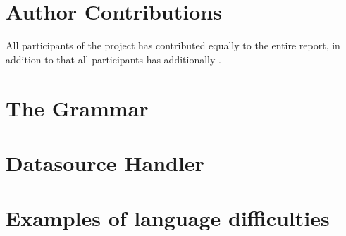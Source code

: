 \documentclass[12pt,a4paper]{article}
\begin{document}
\appendix
\section{Author Contributions}
All participants of the project has contributed equally to the entire report,
in addition to that all participants has additionally .

\section{The Grammar}


\section{Datasource Handler}


\section{Examples of language difficulties}

\end{document}
